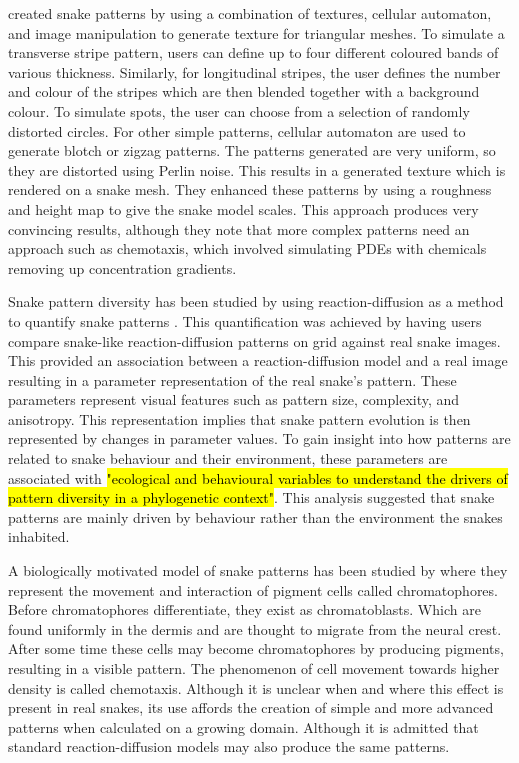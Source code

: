 \cite{pinheiro2017} created snake patterns by using a combination of textures, cellular automaton, and image manipulation to generate texture for triangular meshes. To simulate a transverse stripe pattern, users can define up to four different coloured bands of various thickness. Similarly, for longitudinal stripes, the user defines the number and colour of the stripes which are then blended together with a background colour. To simulate spots, the user can choose from a selection of randomly distorted circles. For other simple patterns, cellular automaton are used to generate blotch or zigzag patterns. The patterns generated are very uniform, so they are distorted using Perlin noise. This results in a generated texture which is rendered on a snake mesh. They enhanced these patterns by using a roughness and height map to give the snake model scales. This approach produces very convincing results, although they note that more complex patterns need an approach such as chemotaxis, which involved simulating PDEs with chemicals removing up concentration gradients.

Snake pattern diversity has been studied by using reaction-diffusion as a method to quantify snake patterns \cite{Allen2013}. This quantification was achieved by having users compare snake-like reaction-diffusion patterns on grid against real snake images. This provided an association between a reaction-diffusion model and a real image resulting in a parameter representation of the real snake’s pattern. These parameters represent visual features such as pattern size, complexity, and anisotropy. This representation implies that snake pattern evolution is then represented by changes in parameter values. To gain insight into how patterns are related to snake behaviour and their environment, these parameters are associated with \hl{"ecological and behavioural variables to understand the drivers of pattern diversity in a phylogenetic context"}. This analysis suggested that snake patterns are mainly driven by behaviour rather than the environment the snakes inhabited. 

A biologically motivated model of snake patterns has been studied by \cite{MURRAY1991} where they represent the movement and interaction of pigment cells called chromatophores. Before chromatophores differentiate, they exist as chromatoblasts. Which are found uniformly in the dermis and are thought to migrate from the neural crest. After some time these cells may become chromatophores by producing pigments, resulting in a visible pattern. The phenomenon of cell movement towards higher density is called chemotaxis. Although it is unclear when and where this effect is present in real snakes, its use affords the creation of simple and more advanced patterns when calculated on a growing domain. Although it is admitted that standard reaction-diffusion models may also produce the same patterns.

